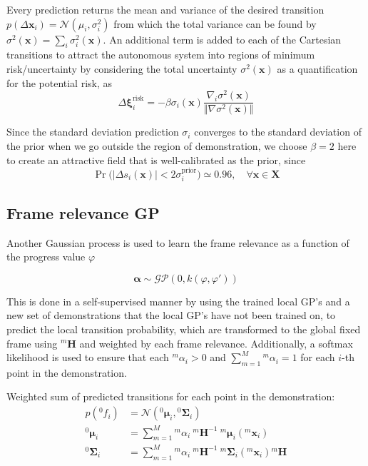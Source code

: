 Every prediction returns the mean and variance of the desired transition \( p(\Delta \boldsymbol{x}_i) = \mathcal{N}(\mu_i, \sigma_i^2) \) from which the total variance can be found by \( \sigma^2(\boldsymbol{x}) = \sum_{i} \sigma_i^2(\boldsymbol{x}) \).
An additional term is added to each of the Cartesian transitions to attract the autonomous system into regions of minimum risk/uncertainty by considering the total uncertainty \( \sigma^2(\boldsymbol{x}) \) as a quantification for the potential risk, as
\begin{equation}
    \Delta \boldsymbol{\xi}_i^{\text{risk}} = - \beta \sigma_i(\boldsymbol{x}) \frac{\nabla_i \sigma^2(\boldsymbol{x})}{\Vert \nabla \sigma^2(\boldsymbol{x}) \Vert}
\end{equation}

Since the standard deviation prediction \( \sigma_i \) converges to the standard deviation of the prior when we go outside the region of demonstration, we choose \( \beta = 2 \) here to create an attractive field that is well-calibrated as the prior, since
\begin{equation}
    \Pr \Big( \big\vert \Delta s_i(\boldsymbol{x}) \big\vert < 2 \sigma_i^\text{prior} \Big) \simeq 0.96, \quad \forall \boldsymbol{x} \in \boldsymbol{X}
\end{equation}

\subsection{Frame relevance GP}\label{sec:frame-relevance-gp}

Another Gaussian process is used to learn the frame relevance as a function of the progress value \( \varphi \)

\begin{equation}
    \boldsymbol{\alpha} \sim \mathcal{GP}(0, k(\varphi, \varphi'))
\end{equation}

This is done in a self-supervised manner by using the trained local GP's and a new set of demonstrations that the local GP's have not been trained on, to predict the local transition probability, which are transformed to the global fixed frame using \( {}^{m}\boldsymbol{H} \) and weighted by each frame relevance.
Additionally, a softmax likelihood is used to ensure that each \( {}^{m}\alpha_i > 0 \) and \( \sum_{m=1}^M {}^{m}\alpha_i = 1 \) for each \( i \)-th point in the demonstration.

Weighted sum of predicted transitions for each point in the demonstration:
\begin{align}
    p \left( {}^{0}f_i \right)
     & =
    \mathcal{N} \left( {}^{0}\boldsymbol{\mu}_i, {}^{0}\boldsymbol{\Sigma}_i \right)
    \\
    {}^{0}\boldsymbol{\mu}_i
     & =
    \sum_{m = 1}^M {}^{m}\alpha_i \ {}^{m}\boldsymbol{H}^{-1} \ {}^{m}\boldsymbol{\mu}_i \left( {}^{m}\boldsymbol{x}_i \right)
    \\
    {}^{0}\boldsymbol{\Sigma}_i
     & =
    \sum_{m = 1}^M {}^{m}\alpha_i \ {}^{m}\boldsymbol{H}^{-1} \ {}^{m}\boldsymbol{\Sigma}_i \left( {}^{m}\boldsymbol{x}_i \right) {}^{m}\boldsymbol{H}
\end{align}

